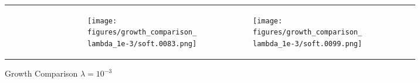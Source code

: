 \documentclass[conference]{IEEEtran}
\newlength{\subfigwidth}
\begin{document}
\begin{figure}
\begin{subfigure}[b]{\textwidth}
\begin{tabular}{r M{\subfigwidth} M{\subfigwidth} M{\subfigwidth} M{\subfigwidth} M{\subfigwidth} }
\begin{subfigure}[b]{\subfigwidth}
            \end{subfigure} &
            \begin{subfigure}[b]{\subfigwidth}
                \texttt{[image: figures/growth\_comparison\_lambda\_1e-3/soft.0083.png]}
            \end{subfigure} &
            \begin{subfigure}[t]{\subfigwidth}
                \texttt{[image: figures/growth\_comparison\_lambda\_1e-3/soft.0099.png]}
            \end{subfigure}    \\
        \end{tabular}
        \caption{Growth Comparison $\lambda=10^{-3}$}


    \end{subfigure}

    \vspace{1em}


    \begin{subfigure}[b]{\textwidth}


\end{subfigure}
\end{figure}
\end{document}
